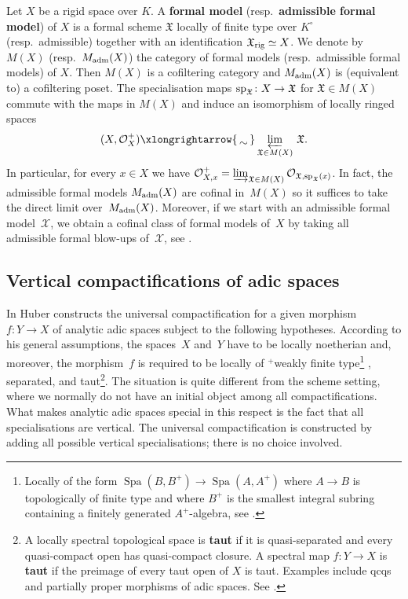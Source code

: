 \documentclass[a4paper,twoside,11pt,reqno]{amsart}
\newcommand{\cO}{{\mathcal O}}
\newcommand{\cX}{{\mathcal X}}
\newcommand{\fX}{{\mathfrak{X}}}
\newcommand{\isomto}{\xlongrightarrow{\,\smash{\raisebox{-0.65ex} 
    {\ensuremath{\displaystyle\sim}}}\,}}
\DeclareMathOperator{\Spa}{Spa}
\theoremstyle{definition}
\numberwithin{equation}{subsection}
\begin{document}
Let $X$ be a rigid space over $K$. A {\bf formal model} (resp.\ {\bf admissible formal model}) of $X$ is a formal scheme $\fX$ locally of finite type over $K^\circ$ (resp.\ admissible) together with an identification $\fX_{\rm rig}\simeq X$. We denote by $M(X)$ (resp.\ $M_{\rm adm}(X)$) the category of formal models (resp.\ admissible formal models) of $X$. Then $M(X)$ is a cofiltering category and $M_{\rm adm}(X)$ is (equivalent to) a cofiltering poset. The specialisation maps ${\rm sp}_\fX\colon X\to \fX$ for $\fX\in M(X)$ commute with the maps in $M(X)$ and induce an isomorphism of locally ringed spaces
\[
    (X, \cO_X^+)\isomto \varprojlim_{\fX\in M(X)} \, \fX. 
\]
In particular, for every $x\in X$ we have $\cO^+_{X,x} = \varinjlim_{\fX\in M(X)} \cO_{\fX, {\rm sp}_{\fX}(x)}$.
In fact, the admissible formal models $M_{\rm adm}(X)$ are cofinal in~$M(X)$ so it suffices to take the direct limit over~$M_{\rm adm}(X)$.
Moreover, if we start with an admissible formal model~$\cX$, we obtain a cofinal class of formal models of~$X$ by taking all admissible formal blow-ups of~$\cX$, see \cite[Chapter~II,\S~3.2 and A.5]{FujiwaraKato}.

\subsection{Vertical compactifications of adic spaces}
\label{ss:univ-comp}

In \cite[\S5.1]{HuberBook} Huber constructs the universal compactification for a given morphism $f\colon Y \to X$ of analytic adic spaces subject to the following hypotheses.
According to his general assumptions, the spaces~$X$ and~$Y$ have to be locally noetherian and, moreover, the morphism~$f$ is required to be locally of ${}^+$weakly finite type\footnote{Locally of the form $\Spa(B,B^+)\to\Spa(A,A^+)$ where $A\to B$ is topologically of finite type and where $B^+$ is the smallest integral subring containing a finitely generated $A^+$-algebra, see \cite[Definition 1.2.1]{HuberBook}.} , separated, and taut\footnote{A locally spectral topological space is {\bf taut} if it is quasi-separated and every quasi-compact open has quasi-compact closure. A spectral map $f\colon Y\to X$ is {\bf taut} if the preimage of every taut open of $X$ is taut. Examples include qcqs and partially proper morphisms of adic spaces. See \cite[\S 5.1]{HuberBook}.}.
The situation is quite different from the scheme setting, where we normally do not have an initial object among all compactifications.
What makes analytic adic spaces special in this respect is the fact that all specialisations are vertical.
The universal compactification is constructed by adding all possible vertical specialisations; there is no choice involved.
\end{document}
